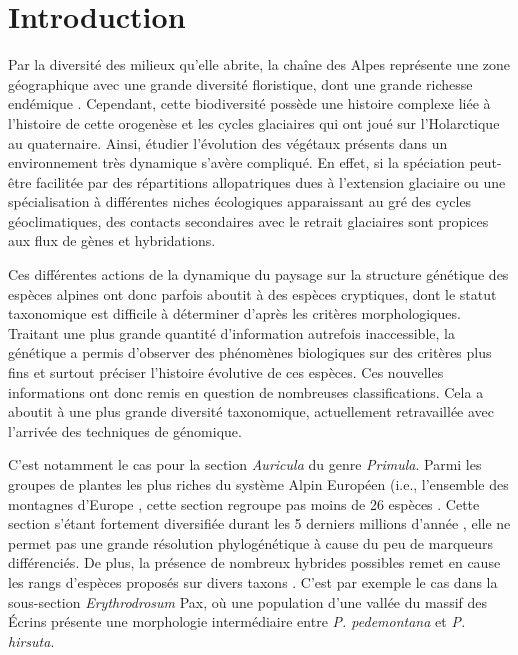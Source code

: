 \section{Introduction}

Par la diversité des milieux qu'elle abrite, la chaîne des Alpes représente une zone géographique avec une grande diversité floristique, dont une grande richesse endémique \citep{Ozenda1995}. Cependant, cette biodiversité possède une histoire complexe liée à l'histoire de cette orogenèse et les cycles glaciaires qui ont joué sur l'Holarctique au quaternaire. Ainsi, étudier l'évolution des végétaux présents dans un environnement très dynamique s'avère compliqué. En effet, si la spéciation peut-être facilitée par des répartitions allopatriques dues à l’extension glaciaire ou une spécialisation à différentes niches écologiques apparaissant au gré des cycles géoclimatiques, des contacts secondaires avec le retrait glaciaires sont propices aux flux de gènes et hybridations. 

Ces différentes actions de la dynamique du paysage sur la structure génétique des espèces alpines ont donc parfois aboutit à des espèces cryptiques, dont le statut taxonomique est difficile à déterminer d'après les critères morphologiques. Traitant une plus grande quantité d'information autrefois inaccessible, la génétique a permis d'observer des phénomènes biologiques sur des critères plus fins et surtout préciser l'histoire évolutive de ces espèces. Ces nouvelles informations ont donc remis en question de nombreuses classifications. Cela a aboutit à une plus grande diversité taxonomique, actuellement retravaillée avec l'arrivée des techniques de génomique. 


C'est notamment le cas pour la section \textit{Auricula} du genre \textit{Primula}. Parmi les groupes de plantes les plus riches du système Alpin Européen (i.e., l'ensemble des montagnes d'Europe \citep{Ozenda1995} , cette section regroupe pas moins de 26 espèces \citep{Zhang2004}. Cette section s'étant fortement diversifiée durant les 5 derniers millions d'année \citep{Zhang2004a,Boucher2016}, elle ne permet pas une grande résolution phylogénétique à cause du peu de marqueurs différenciés. De plus, la présence de nombreux hybrides possibles remet en cause les rangs d'espèces proposés sur divers taxons \citep{Kadereit2011}. C'est par exemple le cas dans la sous-section \textit{Erythrodrosum} Pax, où une population d'une vallée du massif des Écrins présente une morphologie intermédiaire entre \textit{P. pedemontana} et \textit{P. hirsuta}. 


